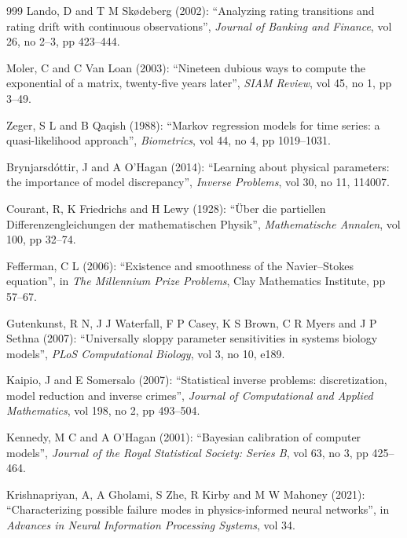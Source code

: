 \begin{thebibliography}{999}
Lando, D and T M Skødeberg (2002): ``Analyzing rating transitions and rating drift with continuous observations'', \emph{Journal of Banking and Finance}, vol 26, no 2--3, pp 423--444.

Moler, C and C Van Loan (2003): ``Nineteen dubious ways to compute the exponential of a matrix, twenty-five years later'', \emph{SIAM Review}, vol 45, no 1, pp 3--49.

Zeger, S L and B Qaqish (1988): ``Markov regression models for time series: a quasi-likelihood approach'', \emph{Biometrics}, vol 44, no 4, pp 1019--1031.

Brynjarsd\'ottir, J and A O'Hagan (2014): ``Learning about physical parameters: the importance of model discrepancy'', \emph{Inverse Problems}, vol 30, no 11, 114007.

Courant, R, K Friedrichs and H Lewy (1928): ``\"Uber die partiellen Differenzengleichungen der mathematischen Physik'', \emph{Mathematische Annalen}, vol 100, pp 32--74.

Fefferman, C L (2006): ``Existence and smoothness of the Navier--Stokes equation'', in \emph{The Millennium Prize Problems}, Clay Mathematics Institute, pp 57--67.

Gutenkunst, R N, J J Waterfall, F P Casey, K S Brown, C R Myers and J P Sethna (2007): ``Universally sloppy parameter sensitivities in systems biology models'', \emph{PLoS Computational Biology}, vol 3, no 10, e189.

Kaipio, J and E Somersalo (2007): ``Statistical inverse problems: discretization, model reduction and inverse crimes'', \emph{Journal of Computational and Applied Mathematics}, vol 198, no 2, pp 493--504.

Kennedy, M C and A O'Hagan (2001): ``Bayesian calibration of computer models'', \emph{Journal of the Royal Statistical Society: Series B}, vol 63, no 3, pp 425--464.

Krishnapriyan, A, A Gholami, S Zhe, R Kirby and M W Mahoney (2021): ``Characterizing possible failure modes in physics-informed neural networks'', in \emph{Advances in Neural Information Processing Systems}, vol 34.


\end{thebibliography}
